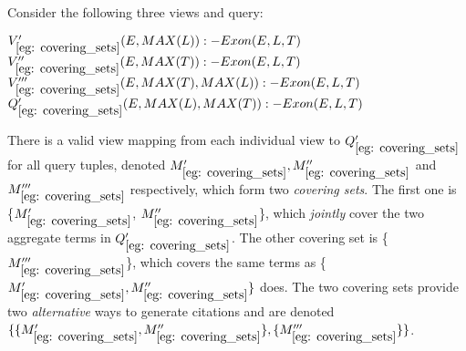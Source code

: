\begin{example}\label{eg: covering_sets}
Consider the following three views and query:
\begin{tabbing}
$V_{\ref{eg: covering_sets}}'(E, MAX(L)) :- Exon(E, L, T)$\\
$V_{\ref{eg: covering_sets}}''(E, MAX(T)) :- Exon(E, L, T)$\\
$V_{\ref{eg: covering_sets}}'''(E, MAX(T), MAX(L)) :- Exon(E, L, T)$\\
$Q_{\ref{eg: covering_sets}}'(E, MAX(L), MAX(T)) :- Exon(E, L, T)$
\end{tabbing}
There is a valid view mapping from each individual view to $Q_{\ref{eg: covering_sets}}'$ for all query tuples, denoted $M_{\ref{eg: covering_sets}}', M_{\ref{eg: covering_sets}}''$ and $M_{\ref{eg: covering_sets}}'''$ respectively, which form two {\em covering sets}. The first one is \{$M_{\ref{eg: covering_sets}}'$, $M_{\ref{eg: covering_sets}}''$\}, which {\em jointly} cover the two aggregate terms in $Q_{\ref{eg: covering_sets}}'$.
The other covering set is \{$M_{\ref{eg: covering_sets}}'''$\}, which covers the same terms as \{$M_{\ref{eg: covering_sets}}', M_{\ref{eg: covering_sets}}''\}$ does. The two covering sets provide two {\em alternative} ways to generate citations and are denoted $\{\{M_{\ref{eg: covering_sets}}', M_{\ref{eg: covering_sets}}''\},\{M_{\ref{eg: covering_sets}}'''\}\}$.

\end{example}








